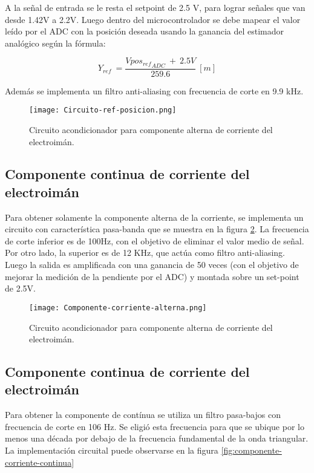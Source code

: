 \noindent A la señal de entrada se le resta el setpoint de 2.5 V, para lograr señales que van desde 1.42V a 2.2V. Luego dentro del microcontrolador se debe mapear el valor leído por el ADC con la posición deseada usando la ganancia del estimador analógico según la fórmula:

\begin{equation} 
	Y_{ref}\ =\frac{Vpo{s_{ref}}_{ADC}\ +\ 2.5V}{259.6}\ [m]
\end{equation}

\noindent Además se implementa un filtro anti-aliasing con frecuencia de corte en 9.9 kHz.

\begin{figure}[H]
	\centering
	\texttt{[image: Circuito-ref-posicion.png]}
	\caption{Circuito acondicionador para componente alterna de corriente del electroimán.}
	\label{fig:circuito-ref-posicion}
\end{figure}

\subsection{Componente  continua de corriente del electroimán}

\noindent Para obtener solamente la componente alterna de la corriente, se implementa un circuito con característica pasa-banda que se muestra en la figura \ref{fig:componente-corriente-alterna}. La frecuencia de corte inferior  es de 100Hz, con el objetivo de eliminar el valor medio de señal. Por otro lado, la superior es de 12 KHz, que actúa como filtro anti-aliasing. Luego la salida es amplificada con una ganancia de 50 veces (con el objetivo de mejorar la medición de la pendiente por el ADC) y montada sobre un set-point de 2.5V.

\begin{figure}[H]
	\centering
	\texttt{[image: Componente-corriente-alterna.png]}
	\caption{ Circuito acondicionador para componente alterna de corriente del electroimán.
	}
	\label{fig:componente-corriente-alterna}
\end{figure}

\subsection{Componente  continua de corriente del electroimán}

\noindent Para obtener la componente de contínua se utiliza un filtro pasa-bajos con frecuencia de corte en 106 Hz. Se eligió esta frecuencia para que se ubique por lo menos una década por debajo de la frecuencia fundamental de la onda triangular. La implementación circuital puede observarse en la figura \ref{fig:componente-corriente-continua}


